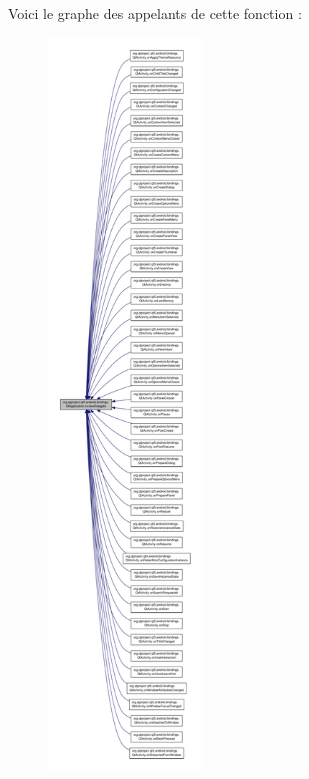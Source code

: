 Voici le graphe des appelants de cette fonction \-:\nopagebreak
\begin{figure}[H]
\begin{center}
\leavevmode
\includegraphics[height=550pt]{classorg_1_1qtproject_1_1qt5_1_1android_1_1bindings_1_1_qt_application_a8e4549506cfd078644266970e25dd1c5_icgraph}
\end{center}
\end{figure}


